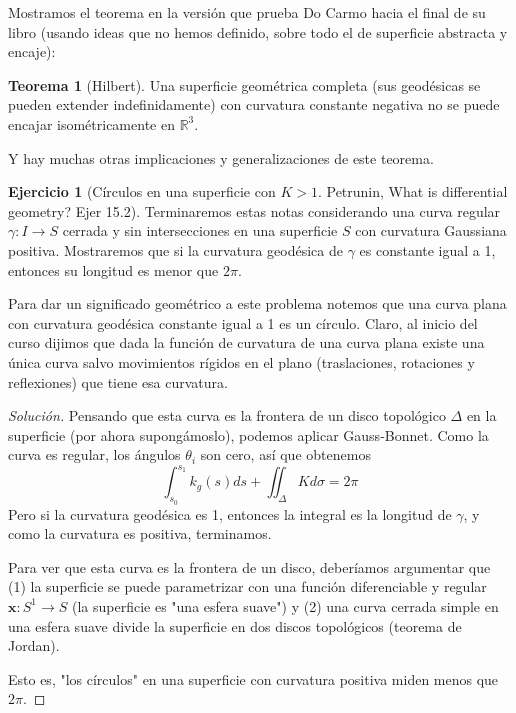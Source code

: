 \documentclass[spanish]{book}
\theoremstyle{definition}
\newtheorem*{teo}{Teorema}
\newtheorem*{ejer}{Ejercicio}
\newcommand{\R}{\mathbb{R}}
\begin{document}
Mostramos el teorema en la versión que prueba Do Carmo hacia el final de su libro (usando ideas que no hemos definido, sobre todo el de superficie abstracta y encaje):
\begin{teo}[Hilbert]
	Una superficie geométrica completa (sus geodésicas se pueden extender indefinidamente) con curvatura constante negativa no se puede encajar isométricamente en $\R^3$.
\end{teo}
Y hay muchas otras implicaciones y generalizaciones de este teorema.
\begin{ejer}[Círculos en una superficie con $K>1$. Petrunin, What is differential geometry? Ejer 15.2]
	Terminaremos estas notas considerando una curva regular $\gamma:I\to S$ cerrada y sin intersecciones en una superficie $S$ con curvatura Gaussiana positiva. Mostraremos que si la curvatura geodésica de $\gamma$ es constante igual a 1, entonces su longitud es menor que $2\pi$.
	
	Para dar un significado geométrico a este problema notemos que una curva plana con curvatura geodésica constante igual a 1 es un círculo. Claro, al inicio del curso dijimos que dada la función de curvatura de una curva plana existe una única curva salvo movimientos rígidos en el plano (traslaciones, rotaciones y reflexiones) que tiene esa curvatura.
\end{ejer}
\begin{proof}[Solución]
	Pensando que esta curva es la frontera de un disco topológico $\Delta$ en la superficie (por ahora supongámoslo), podemos aplicar Gauss-Bonnet. Como la curva es regular, los ángulos $\theta_i$ son cero, así que obtenemos
	\[\int_{s_0}^{s_1} k_g(s)ds+\iint_\Delta Kd\sigma=2\pi\]
	Pero si la curvatura geodésica es 1, entonces la integral es la longitud de $\gamma$, y como la curvatura es positiva, terminamos.
	
	Para ver que esta curva es la frontera de un disco, deberíamos argumentar que (1) la superficie se puede parametrizar con una función diferenciable y regular $\mathbf x:S^1\to S$ (la superficie es "una esfera suave") y (2) una curva cerrada simple en una esfera suave divide la superficie en dos discos topológicos (teorema de Jordan).
	
	Esto es, "los círculos" en una superficie con curvatura positiva miden menos que $2\pi$.
\end{proof}
\end{document}
